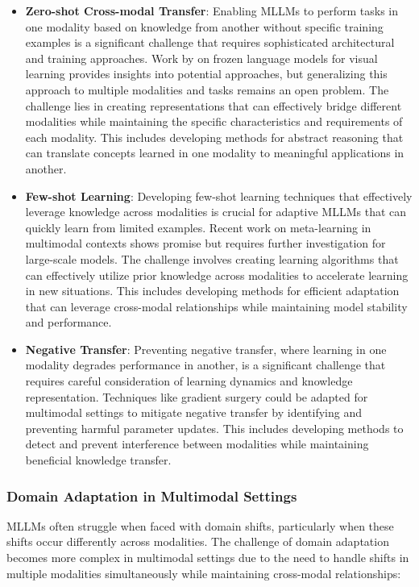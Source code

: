 \begin{itemize}
    \item \textbf{Zero-shot Cross-modal Transfer}: Enabling MLLMs to perform tasks in one modality based on knowledge from another without specific training examples is a significant challenge that requires sophisticated architectural and training approaches. Work by on frozen language models for visual learning provides insights into potential approaches, but generalizing this approach to multiple modalities and tasks remains an open problem. The challenge lies in creating representations that can effectively bridge different modalities while maintaining the specific characteristics and requirements of each modality. This includes developing methods for abstract reasoning that can translate concepts learned in one modality to meaningful applications in another.
    
    \item \textbf{Few-shot Learning}: Developing few-shot learning techniques that effectively leverage knowledge across modalities is crucial for adaptive MLLMs that can quickly learn from limited examples. Recent work on meta-learning in multimodal contexts \citep{pahde2021multimodal} shows promise but requires further investigation for large-scale models. The challenge involves creating learning algorithms that can effectively utilize prior knowledge across modalities to accelerate learning in new situations. This includes developing methods for efficient adaptation that can leverage cross-modal relationships while maintaining model stability and performance.
    
    \item \textbf{Negative Transfer}: Preventing negative transfer, where learning in one modality degrades performance in another, is a significant challenge that requires careful consideration of learning dynamics and knowledge representation. Techniques like gradient surgery could be adapted for multimodal settings to mitigate negative transfer by identifying and preventing harmful parameter updates. This includes developing methods to detect and prevent interference between modalities while maintaining beneficial knowledge transfer.
\end{itemize}

\subsubsection{Domain Adaptation in Multimodal Settings}
MLLMs often struggle when faced with domain shifts, particularly when these shifts occur differently across modalities. The challenge of domain adaptation becomes more complex in multimodal settings due to the need to handle shifts in multiple modalities simultaneously while maintaining cross-modal relationships:

